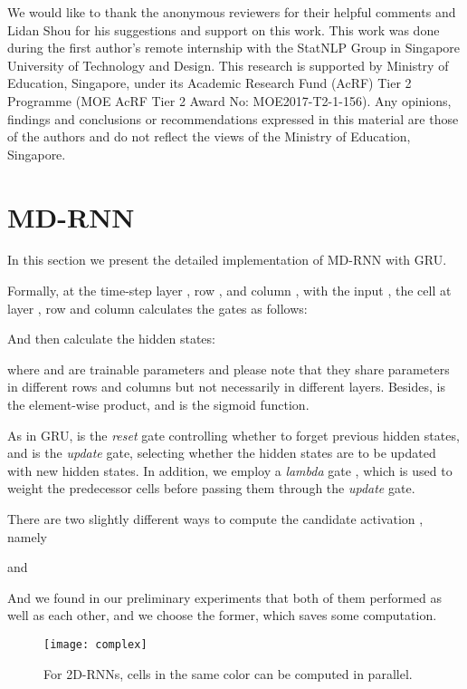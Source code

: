 \documentclass[11pt,a4paper]{article}
\begin{document}
We would like to thank the anonymous reviewers for their helpful comments and Lidan Shou for his suggestions and support on this work. This work was done during the first author's remote internship with the StatNLP Group in Singapore University of Technology and Design. This research is supported by Ministry of Education, Singapore, under its Academic Research Fund (AcRF) Tier 2 Programme (MOE AcRF Tier 2 Award No: MOE2017-T2-1-156). 
Any opinions, findings and conclusions or recommendations expressed in this material are those of the authors and do not reflect the views of the Ministry of Education, Singapore.






\appendix

\section{MD-RNN} \label{sec:mdrnn}

In this section we present the detailed implementation of MD-RNN with GRU.

Formally, at the time-step layer , row , and column , with the input ,
the cell at layer , row  and column  calculates the gates as follows:

And then calculate the hidden states:

where  and  are trainable parameters and
please note that they share parameters in different rows and columns but not necessarily in different layers.
Besides,  is the element-wise product, and  is the sigmoid function.

As in GRU,  is the \emph{reset} gate controlling whether to forget previous hidden states, and
 is the \emph{update} gate, selecting whether the hidden states are to be updated with new hidden states.
In addition, we employ a \emph{lambda} gate , which is
used to weight the predecessor cells before passing them through the \emph{update} gate.

There are two slightly different ways to compute the candidate activation , namely

and

And we found in our preliminary experiments that both of them performed as well as each other, and we choose the former, which saves some computation.

\begin{figure}[t!]
    \centering
    \texttt{[image: complex]}
    \caption{For 2D-RNNs, cells in the same color can be computed in parallel.}
    \label{fig:complex}
\end{figure}
\end{document}
